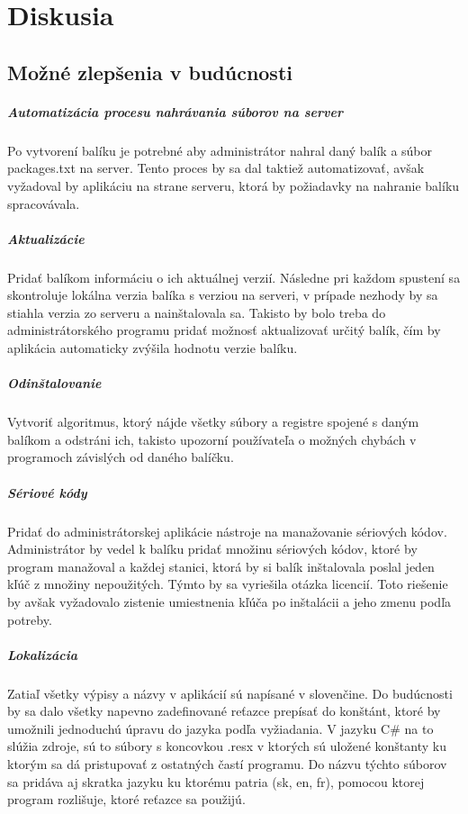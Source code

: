 \chapter{Diskusia}

\section{Možné zlepšenia v budúcnosti}
\label{sec:zlepsenia}
\paragraph{Automatizácia procesu nahrávania súborov na server}
Po vytvorení balíku je potrebné aby administrátor nahral daný balík a súbor packages.txt na server. Tento proces by sa dal taktiež automatizovať, avšak vyžadoval by aplikáciu na strane serveru, ktorá by požiadavky na nahranie balíku spracovávala.

\paragraph{Aktualizácie}
Pridať balíkom informáciu o ich aktuálnej verzií. Následne pri každom spustení sa skontroluje lokálna verzia balíka s verziou na serveri, v prípade nezhody by sa stiahla verzia zo serveru a nainštalovala sa. Takisto by bolo treba do administrátorského programu pridať možnosť aktualizovať určitý balík, čím by aplikácia automaticky zvýšila hodnotu verzie balíku.

\paragraph{Odinštalovanie}
Vytvoriť algoritmus, ktorý nájde všetky súbory a registre spojené s daným balíkom a odstráni ich, takisto upozorní používateľa o možných chybách v programoch závislých od daného balíčku.

\paragraph{Sériové kódy}
Pridať do administrátorskej aplikácie nástroje na manažovanie sériových kódov. Administrátor by vedel k balíku pridať množinu sériových kódov, ktoré by program manažoval a každej stanici, ktorá by si balík inštalovala poslal jeden kľúč z množiny nepoužitých. Týmto by sa vyriešila otázka licencií. Toto riešenie by avšak vyžadovalo zistenie umiestnenia kľúča po inštalácii a jeho zmenu podľa potreby.

\paragraph{Lokalizácia}
Zatiaľ všetky výpisy a názvy v aplikácií sú napísané v slovenčine. Do budúcnosti by sa dalo všetky napevno zadefinované reťazce prepísať do konštánt, ktoré by umožnili jednoduchú úpravu do jazyka podľa vyžiadania. V jazyku C\# na to slúžia zdroje, sú to súbory s koncovkou .resx v ktorých sú uložené konštanty ku ktorým sa dá pristupovať z ostatných častí programu. Do názvu týchto súborov sa pridáva aj skratka jazyku ku ktorému patria (sk, en, fr), pomocou ktorej program rozlišuje, ktoré reťazce sa použijú.

